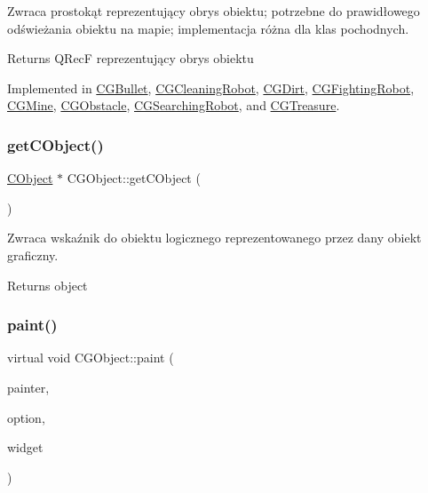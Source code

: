 Zwraca prostokąt reprezentujący obrys obiektu; potrzebne do prawidłowego odświeżania obiektu na mapie; implementacja różna dla klas pochodnych. 

\begin{DoxyReturn}{Returns}
Q\+RecF reprezentujący obrys obiektu 
\end{DoxyReturn}


Implemented in \mbox{\hyperlink{class_c_g_bullet_a7be9c986a5c21d0a27dd5d64b209a82d}{C\+G\+Bullet}}, \mbox{\hyperlink{class_c_g_cleaning_robot_a6fe8401e3b604cf5c3e449a56bb5655c}{C\+G\+Cleaning\+Robot}}, \mbox{\hyperlink{class_c_g_dirt_aa7ff4b489e4fdbdaa456b40394b635f1}{C\+G\+Dirt}}, \mbox{\hyperlink{class_c_g_fighting_robot_a945d974c6e61507a9f671ab7288df85a}{C\+G\+Fighting\+Robot}}, \mbox{\hyperlink{class_c_g_mine_ad11ed34f5cd02b51fd2baeaf700daba2}{C\+G\+Mine}}, \mbox{\hyperlink{class_c_g_obstacle_a88a124737ae6f96c6b07316591ecdb34}{C\+G\+Obstacle}}, \mbox{\hyperlink{class_c_g_searching_robot_aa0cf51f6acdfa865c130f0cd16860625}{C\+G\+Searching\+Robot}}, and \mbox{\hyperlink{class_c_g_treasure_a103be7d49202d07d9260917a7d6e8429}{C\+G\+Treasure}}.

\mbox{\label{class_c_g_object_a6e749272ebf5a43d43927cdfed21c46c}} 
\subsubsection{\texorpdfstring{get\+C\+Object()}{getCObject()}}
{\footnotesize\ttfamily \mbox{\hyperlink{class_c_object}{C\+Object}} $\ast$ C\+G\+Object\+::get\+C\+Object (\begin{DoxyParamCaption}{ }\end{DoxyParamCaption})}



Zwraca wskaźnik do obiektu logicznego reprezentowanego przez dany obiekt graficzny. 

\begin{DoxyReturn}{Returns}
object 
\end{DoxyReturn}
\mbox{\label{class_c_g_object_a9622c313eb09ca5fc0e34f5d2aaac910}} 
\subsubsection{\texorpdfstring{paint()}{paint()}}
{\footnotesize\ttfamily virtual void C\+G\+Object\+::paint (\begin{DoxyParamCaption}\item[{Q\+Painter $\ast$}]{painter,  }\item[{const Q\+Style\+Option\+Graphics\+Item $\ast$}]{option,  }\item[{Q\+Widget $\ast$}]{widget }\end{DoxyParamCaption})\hspace{0.3cm}{\ttfamily [pure virtual]}}




